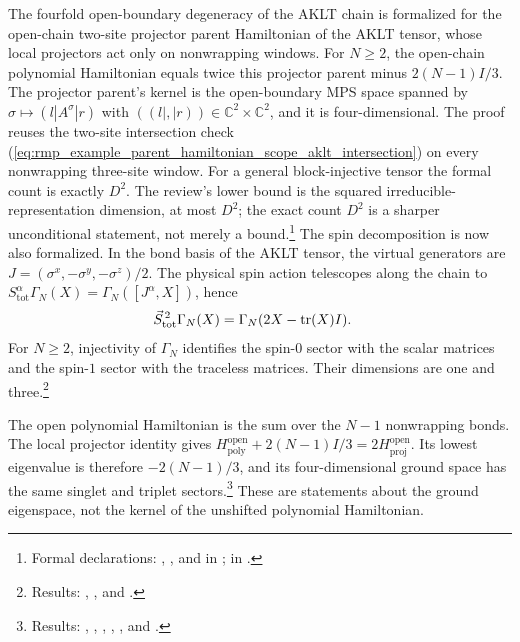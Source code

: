 \documentclass{article}
\begin{document}
The fourfold open-boundary degeneracy of the AKLT chain is formalized for the
open-chain two-site projector parent Hamiltonian of the AKLT tensor, whose
local projectors act only on nonwrapping windows. For $N\ge2$, the open-chain
polynomial Hamiltonian equals twice this projector parent minus $2(N-1)I/3$.
The projector parent's kernel is the open-boundary MPS space
spanned by $\sigma\mapsto(l|A^\sigma|r)$ with
$((l|,|r))\in\mathbb C^2\times\mathbb C^2$, and it is
four-dimensional. The proof reuses the two-site intersection check
(\ref{eq:rmp_example_parent_hamiltonian_scope_aklt_intersection}) on every
nonwrapping three-site window. For a general block-injective tensor the
formal count is exactly $D^2$. The review's lower bound is the squared
irreducible-representation dimension, at most $D^2$; the exact count $D^2$
is a sharper unconditional statement, not merely a bound.\footnote{Formal declarations:
,
, and
in ;
 in
.} The
spin decomposition is now also formalized. In the bond basis of the AKLT
tensor, the virtual generators are $J=(\sigma^x,-\sigma^y,-\sigma^z)/2$.
The physical spin action telescopes along the chain to
$S^\alpha_{\mathrm{tot}}\Gamma_N(X)=\Gamma_N([J^\alpha,X])$, hence
\begin{align}
    \vec S_{\mathrm{tot}}^{\,2}\Gamma_N(X)
      &=\Gamma_N(2X-\operatorname{tr}(X)I).\notag
\end{align}
For $N\ge2$, injectivity of $\Gamma_N$ identifies the spin-$0$ sector with
the scalar matrices and the spin-$1$ sector with the traceless matrices.
Their dimensions are one and three.\footnote{Results:
,
, and
.}

The open polynomial Hamiltonian is the sum over the $N-1$ nonwrapping bonds.
The local projector identity gives
$H^{\mathrm{open}}_{\mathrm{poly}}+2(N-1)I/3=2H^{\mathrm{open}}_{\mathrm{proj}}$.
Its lowest eigenvalue is therefore $-2(N-1)/3$, and its four-dimensional
ground space has the same singlet and triplet sectors.\footnote{Results:
,
,
,
,
, and
.}
These are statements about the ground eigenspace, not the kernel of the
unshifted polynomial Hamiltonian.
\end{document}
